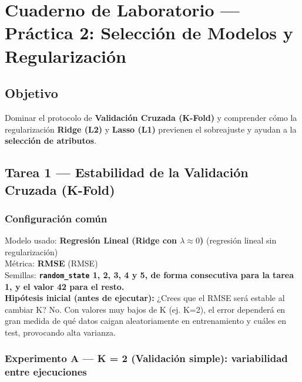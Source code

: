 \documentclass{report} %
\begin{document}
\chapter{Cuaderno de Laboratorio — Práctica 2: Selección de Modelos y Regularización}

\section*{Objetivo}
Dominar el protocolo de \textbf{Validación Cruzada (K-Fold)} y comprender cómo la regularización
\textbf{Ridge (L2)} y \textbf{Lasso (L1)} previenen el sobreajuste y ayudan a la \textbf{selección de atributos}.


\section{Tarea 1 — Estabilidad de la Validación Cruzada (K-Fold)}

\subsection*{Configuración común}
Modelo usado: \textbf{Regresión Lineal (Ridge con $\lambda \approx 0$)} (regresión lineal sin regularización)\\
Métrica: \textbf{RMSE} (RMSE)\\
Semillas: \textbf{\texttt{random\_state} 1, 2, 3, 4 y 5, de forma consecutiva para la tarea 1, y el valor 42 para el resto.}\\

\vspace{0.3cm}
\noindent\textbf{Hipótesis inicial (antes de ejecutar):}
¿Crees que el RMSE será estable al cambiar K? No. Con valores muy bajos de K (ej. K=2), el error dependerá en gran medida de qué datos caigan aleatoriamente en entrenamiento y cuáles en test, provocando alta varianza.

\vspace{0.5cm}

\subsection{Experimento A — K = 2 (Validación simple): variabilidad entre ejecuciones}
\end{document}
